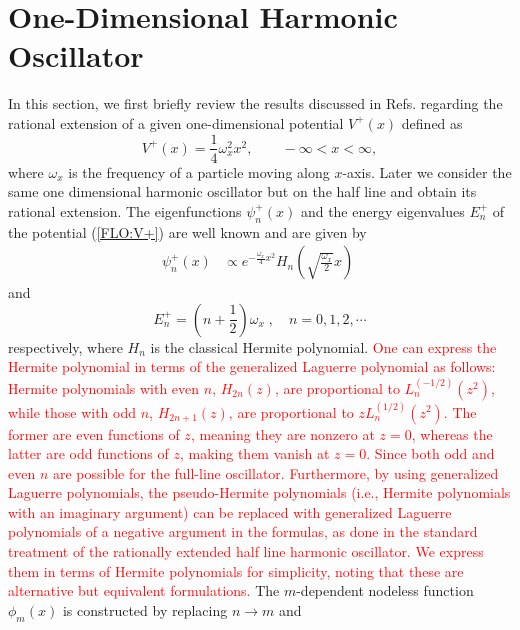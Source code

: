 \documentclass[12pt]{article}
\numberwithin{equation}{section} %
\begin{document}

\section{One-Dimensional Harmonic Oscillator}
In this section, we first briefly review the results discussed in Refs. 
\cite{fellows2009factorization, marquette2013two} regarding the rational 
extension of a given one-dimensional potential \( V^+(x) \) defined as 
\begin{equation}\label{FLO:V+}
    V^+(x)=\frac{1}{4}\omega_x^2{x}^2,\qquad -\infty <x<\infty,
\end{equation}
where $\omega_x$ is the frequency of a particle moving along $x$-axis. Later we
consider the same one dimensional harmonic oscillator but on the half line and obtain its rational extension.
The eigenfunctions $\psi_n^+(x)$ and the energy eigenvalues $E^+_n$ of the potential 
(\ref{FLO:V+}) are well known  and are given by
\begin{align}\label{FLO:psi+}
 \psi_n^+(x)&\propto e^{-\frac{\omega_x}{4} x^2}H_n\left(\sqrt{\frac{\omega_x}{2}} x\right)\;  \nonumber
\end{align} 
and
\begin{equation}
	E^+_n=\left(n+\frac{1}{2}\right)\omega_x\;,\quad n=0,1,2,\cdots
\end{equation}
respectively, where $H_n$ is the classical Hermite polynomial. \textcolor{red}{One can express the Hermite polynomial in terms of the generalized Laguerre polynomial as follows:  
Hermite polynomials with even \( n \), \( H_{2n}(z) \), are proportional to \( L_n^{(-1/2)}(z^2) \), while those with odd \( n \), \( H_{2n+1}(z) \), are proportional to \( z L_n^{(1/2)}(z^2) \).  
The former are even functions of \( z \), meaning they are nonzero at \( z = 0 \), whereas the latter are odd functions of \( z \), making them vanish at \( z = 0 \). Since both odd and even \( n \) are possible for the full-line oscillator. Furthermore, by using generalized Laguerre polynomials, the pseudo-Hermite polynomials (i.e., Hermite polynomials with an imaginary argument) can be replaced with generalized Laguerre polynomials of a negative argument in the formulas, as done in the standard treatment of the rationally extended half line harmonic oscillator. We express them in terms of Hermite polynomials for simplicity, noting that these are alternative but equivalent formulations.}
The $m$-dependent
nodeless function $\phi_m(x)$ is constructed \cite{fellows2009factorization} by replacing $n\rightarrow m$ and 
\end{document}
